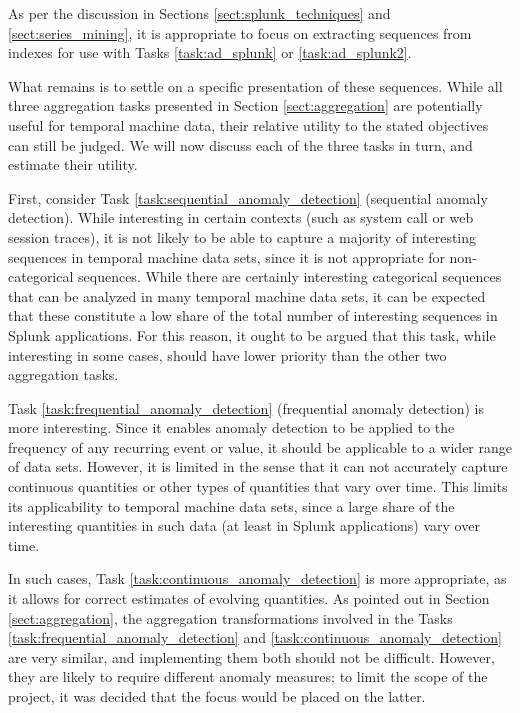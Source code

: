 As per the discussion in Sections \ref{sect:splunk_techniques} and \ref{sect:series_mining}, it is appropriate to focus on extracting sequences from indexes for use with Tasks \ref{task:ad_splunk} or \ref{task:ad_splunk2}.

What remains is to settle on a specific presentation of these sequences. While all three aggregation tasks presented in Section \ref{sect:aggregation} are potentially useful for temporal machine data, their relative utility to the stated objectives can still be judged. We will now discuss each of the three tasks in turn, and estimate their utility.

First, consider Task \ref{task:sequential_anomaly_detection} (sequential anomaly detection). While interesting in certain contexts (such as system call or web session traces), it is not likely to be able to capture a majority of interesting sequences in temporal machine data sets, since it is not appropriate for non-categorical sequences. While there are certainly interesting categorical sequences that can be analyzed in many temporal machine data sets, it can be expected that these constitute a low share of the total number of interesting sequences in Splunk applications. For this reason, it ought to be argued that this task, while interesting in some cases, should have lower priority than the other two aggregation tasks.

Task \ref{task:frequential_anomaly_detection} (frequential anomaly detection) is more interesting. Since it enables anomaly detection to be applied to the frequency of any recurring event or value, it should be applicable to a wider range of data sets. However, it is limited in the sense that it can not accurately capture continuous quantities or other types of quantities that vary over time. This limits its applicability to temporal machine data sets, since a large share of the interesting quantities in such data (at least in Splunk applications) vary over time.

In such cases, Task \ref{task:continuous_anomaly_detection} is more appropriate, as it allows for correct estimates of evolving quantities. As pointed out in Section \ref{sect:aggregation}, the aggregation transformations involved in the Tasks \ref{task:frequential_anomaly_detection} and \ref{task:continuous_anomaly_detection} are very similar, and implementing them both should not be difficult. However, they are likely to require different anomaly measures; to limit the scope of the project, it was decided that the focus would be placed on the latter.

